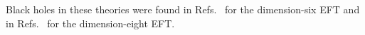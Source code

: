 \documentclass[twocolumn,prd,aps,superscriptaddress,preprintnumbers,tightenlines,showpacs,nofootinbib,eqsecnum,amsfonts,amsmath,longbibliography]{revtex4-1}
\newcommand{\lame}{\lambda_{\rm e}}
\newcommand{\lamo}{\lambda_{\rm o}}
\begin{document}
Black holes in these theories were found in Refs.~\cite{deRham:2020ejn,Cano:2020cao} for the dimension-six EFT
and in Refs.~\cite{Cardoso:2018ptl} for the dimension-eight EFT.


%
%
\end{document}
